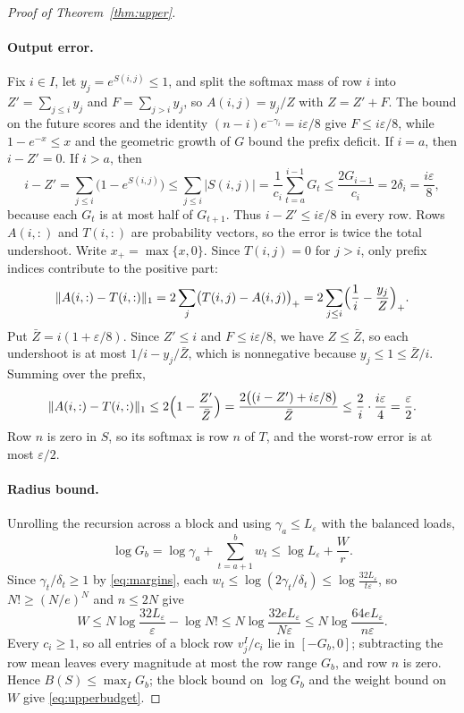 \documentclass[10pt]{article} %
\theoremstyle{definition}
\begin{document}
\begin{proof}[Proof of Theorem~\ref{thm:upper}]
\paragraph{Output error.}
Fix \(i\in I\), let \(y_j=e^{S(i,j)}\le1\), and split the softmax mass of
row \(i\) into \(Z'=\sum_{j\le i}y_j\) and \(F=\sum_{j>i}y_j\), so
\(A(i,j)=y_j/Z\) with \(Z=Z'+F\).  The bound on the future scores and the
identity \((n-i)e^{-\gamma_i}=i\varepsilon/8\) give
\(F\le i\varepsilon/8\), while
\(1-e^{-x}\le x\) and the geometric growth of \(G\) bound the prefix
deficit.  If \(i=a\), then \(i-Z'=0\).  If \(i>a\), then
\[
 i-Z'=\sum_{j\le i}\bigl(1-e^{S(i,j)}\bigr)\le\sum_{j\le i}|S(i,j)|
 =\frac1{c_i}\sum_{t=a}^{i-1}G_t\le\frac{2G_{i-1}}{c_i}=2\delta_i
 =\frac{i\varepsilon}8,
\]
because each \(G_t\) is at most half of \(G_{t+1}\).  Thus
\(i-Z'\le i\varepsilon/8\) in every row.  Rows \(A(i,:)\) and \(T(i,:)\)
are probability vectors, so the error is twice the total undershoot.  Write
\(x_+=\max\{x,0\}\).  Since \(T(i,j)=0\) for \(j>i\), only prefix indices
contribute to the positive part:
\[
 \|A(i,:)-T(i,:)\|_1=2\sum_j\bigl(T(i,j)-A(i,j)\bigr)_+
 =2\sum_{j\le i}\Bigl(\frac1i-\frac{y_j}Z\Bigr)_+ .
\]
Put \(\bar Z=i(1+\varepsilon/8)\).  Since \(Z'\le i\) and
\(F\le i\varepsilon/8\), we have \(Z\le\bar Z\), so each undershoot is at
most \(1/i-y_j/\bar Z\), which is nonnegative because
\(y_j\le1\le\bar Z/i\).  Summing over the prefix,
\[
 \|A(i,:)-T(i,:)\|_1
 \le2\Bigl(1-\frac{Z'}{\bar Z}\Bigr)
 =\frac{2\bigl((i-Z')+i\varepsilon/8\bigr)}{\bar Z}
 \le\frac2i\cdot\frac{i\varepsilon}4=\frac\varepsilon2 .
\]
Row \(n\) is zero in \(S\), so its softmax is row \(n\) of \(T\),
and the worst-row error is at most \(\varepsilon/2\).

\paragraph{Radius bound.}
Unrolling the recursion across a block and using \(\gamma_a\le
L_\varepsilon\) with the balanced loads,
\[
 \log G_b=\log\gamma_a+\sum_{t=a+1}^bw_t\le\log L_\varepsilon+\frac Wr .
\]
Since \(\gamma_t/\delta_t\ge1\) by \eqref{eq:margins}, each
\(w_t\le\log(2\gamma_t/\delta_t)\le\log\frac{32L_\varepsilon}{t\varepsilon}\),
so \(N!\ge(N/e)^N\) and \(n\le2N\) give
\[
 W\le N\log\frac{32L_\varepsilon}\varepsilon-\log N!
 \le N\log\frac{32eL_\varepsilon}{N\varepsilon}
 \le N\log\frac{64eL_\varepsilon}{n\varepsilon} .
\]
Every \(c_i\ge1\), so all entries of a block row \(v^I_j/c_i\) lie in
\([-G_b,0]\); subtracting the row mean leaves every magnitude at most the
row range \(G_b\), and row \(n\) is zero.  Hence \(B(S)\le\max_IG_b\); the
block bound on \(\log G_b\) and the weight bound on \(W\) give
\eqref{eq:upperbudget}.
\end{proof}
\end{document}
